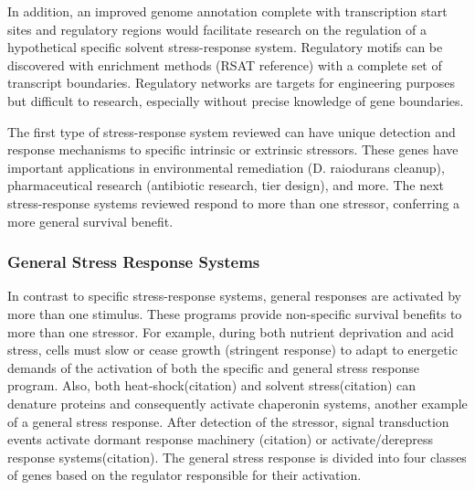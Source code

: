 In addition, an improved genome annotation complete with transcription start sites and regulatory regions would facilitate research on the regulation of a hypothetical specific solvent stress-response system. Regulatory motifs can be discovered with enrichment methods (RSAT reference) with a complete set of transcript boundaries. Regulatory networks are targets for engineering purposes but difficult to research, especially without precise knowledge of gene boundaries.

The first type of stress-response system reviewed can have unique detection and response mechanisms to specific intrinsic or extrinsic stressors. These genes have important applications in environmental remediation (D. raiodurans cleanup), pharmaceutical research (antibiotic research, tier design), and more. The next stress-response systems reviewed respond to more than one stressor, conferring a more general survival benefit.


\subsubsection{General Stress Response Systems}

In contrast to specific stress-response systems, general responses are activated by more than one stimulus. These programs provide non-specific survival benefits to more than one stressor. For example, during both nutrient deprivation and acid stress, cells must slow or cease growth (stringent response) to adapt to energetic demands of the activation of both the specific and general stress response program. Also, both heat-shock(citation) and solvent stress(citation) can denature proteins and consequently activate chaperonin systems, another example of a general stress response. After detection of the stressor, signal transduction events activate dormant response machinery (citation) or activate/derepress response systems(citation). The general stress response is divided into four classes of genes based on the regulator responsible for their activation. 

